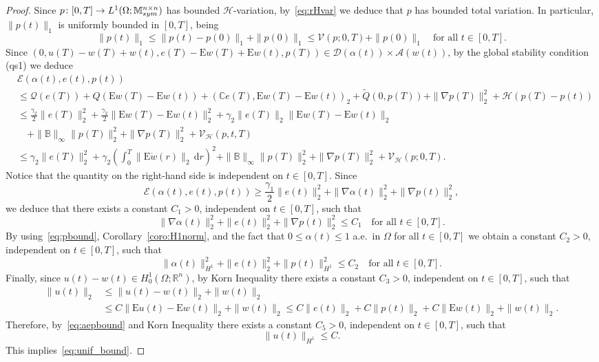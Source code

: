 \documentclass[reqno]{amsart}
\theoremstyle{definition}
\numberwithin{equation}{section}
\def\de {\mathrm{d}}
\def\R {\mathbb R}
\def\M {\mathbb M^{n\times n}_{\rm sym}}
\def\C {\mathbb C}
\def\B {\mathbb B}
\def\EE {\mathrm{E}}
\begin{document}
\begin{proof}
Since $p\colon [0,T]\to L^1(\Omega;\M)$ has bounded $\mathcal H$-variation, by~\eqref{eq:rHvar} we deduce that $p$ has bounded total variation. In particular, $\|p(t)\|_1$ is uniformly bounded in $[0,T]$, being
\begin{equation}\label{eq:pbound}
\|p(t)\|_1\le \|p(t)-p(0)\|_1+\|p(0)\|_1\le \mathcal V(p;0,T)+\|p(0)\|_1\quad\text{for all $t\in[0,T]$}.    
\end{equation}
Since $(0,u(T)-w(T)+w(t),e(T)-\EE w(T)+\EE w(t),p(T))\in\mathcal D(\alpha(t))\times\mathcal A(w(t))$, by the global stability condition (qs1) we deduce
\begin{align*}
&\mathcal E(\alpha(t),e(t),p(t))\\
&\le \mathcal Q(e(T))+Q(\EE w(T)-\EE w(t))+(\C e(T),\EE w(T)-\EE w(t))_2+\tilde Q(0,p(T))+\|\nabla p(T)\|_2^2+\mathcal H(p(T)-p(t))\\
&\le \frac{\gamma_2}{2}\|e(T)\|_2^2+ \frac{\gamma_2}{2}\|\EE w(T)-\EE w(t)\|_2^2+ \gamma_2\|e(T)\|_2\|\EE w(T)-\EE w(t)\|_2\\
&\quad+\|\B\|_\infty\|p(T)\|_2^2+\|\nabla p(T)\|_2^2+\mathcal V_{\mathcal H}(p,t,T)\\
&\le\gamma_2\|e(T)\|_2^2+\gamma_2\left(\int_0^T\|\EE \dot w(r)\|_2\,\de r\right)^2+\|\B\|_\infty\|p(T)\|_2^2+ \|\nabla p(T)\|_2^2+\mathcal V_{\mathcal H}(p;0,T).
\end{align*}
Notice that the quantity on the right-hand side is independent on $t\in[0,T]$. Since
$$\mathcal E(\alpha(t),e(t),p(t))\ge \frac{\gamma_1}{2}\|e(t)\|_2^2+\|\nabla\alpha(t)\|_2^2+\|\nabla p(t)\|_2^2,$$
we deduce that there exists a constant $C_1>0$, independent on $t\in[0,T]$, such that
$$\|\nabla \alpha(t)\|_2^2+\|e(t)\|_2^2+\|\nabla p(t)\|_2^2\le C_1\quad\text{for all $t\in[0,T]$}.$$
By using~\eqref{eq:pbound}, Corollary~\ref{coro:H1norm}, and the fact that $0\le \alpha(t)\le 1$ a.e.\ in $\Omega$ for all $t\in[0,T]$ we obtain a constant $C_2>0$, independent on $t\in[0,T]$, such that
\begin{equation}\label{eq:aepbound}
\|\alpha(t)\|_{H^1}^2+\|e(t)\|_2^2+\|p(t)\|_{H^1}^2\le C_2\quad\text{for all $t\in[0,T]$}.   
\end{equation}
Finally, since $u(t)-w(t)\in H^1_0(\Omega;\R^n)$, by Korn Inequality there exists a constant $C_3>0$, independent on $t\in[0,T]$, such that 
\begin{align*}
\|u(t)\|_2&\le \|u(t)-w(t)\|_2+\|w(t)\|_2\\
&\le C\|\EE u(t)-\EE w(t)\|_2+\|w(t)\|_2\le C\|e(t)\|_2+C\|p(t)\|_2+C\|\EE w(t)\|_2+\|w(t)\|_2.    
\end{align*}
Therefore, by~\eqref{eq:aepbound} and Korn Inequality there exists a constant $C_5>0$, independent on $t\in[0,T]$, such that 
$$\|u(t)\|_{H^1}\le C.$$
This implies~\eqref{eq:unif_bound}. 


\end{proof}
\end{document}

